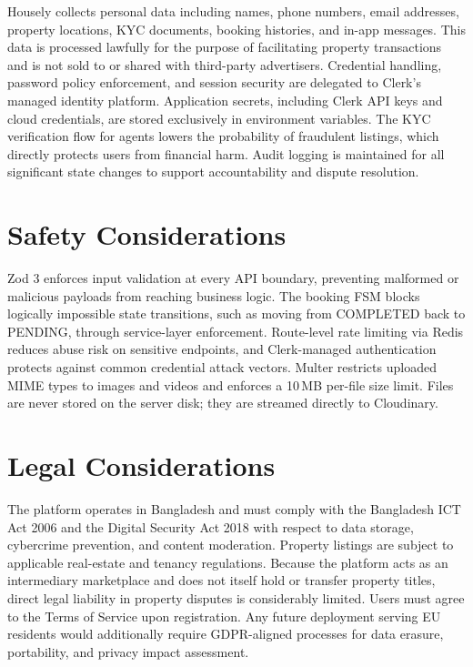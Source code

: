 \documentclass[12pt,a4paper]{report}
\begin{document}
Housely collects personal data including names, phone numbers, email addresses, property
locations, KYC documents, booking histories, and in-app messages. This data is processed
lawfully for the purpose of facilitating property transactions and is not sold to or shared
with third-party advertisers. Credential handling, password policy enforcement, and session
security are delegated to Clerk's managed identity platform. Application secrets,
including Clerk API keys and cloud credentials, are stored exclusively in environment
variables. The KYC verification flow
for agents lowers the probability of fraudulent listings, which directly protects users
from financial harm. Audit logging is maintained for all significant state changes to
support accountability and dispute resolution.

\section{Safety Considerations}

Zod 3 enforces input validation at every API boundary, preventing malformed or malicious
payloads from reaching business logic. The booking FSM blocks logically impossible state
transitions, such as moving from COMPLETED back to PENDING, through service-layer
enforcement. Route-level rate limiting via Redis reduces abuse risk on sensitive endpoints,
and Clerk-managed authentication protects against common credential attack vectors.
Multer restricts uploaded MIME types to images and videos and enforces a
10\,MB per-file size limit. Files are never stored on the server disk; they are streamed
directly to Cloudinary.

\section{Legal Considerations}

The platform operates in Bangladesh and must comply with the Bangladesh ICT Act 2006
and the Digital Security Act 2018 with respect to data storage, cybercrime prevention,
and content moderation. Property listings are subject to applicable real-estate and
tenancy regulations. Because the platform acts as an intermediary marketplace and does
not itself hold or transfer property titles, direct legal liability in property disputes is
considerably limited. Users must agree to the Terms of Service upon registration. Any
future deployment serving EU residents would additionally require GDPR-aligned processes
for data erasure, portability, and privacy impact assessment.
\end{document}
